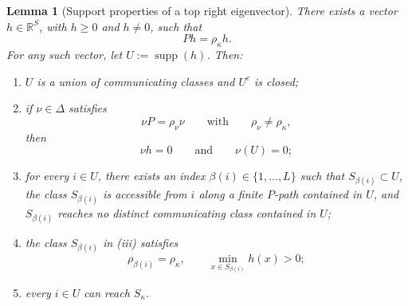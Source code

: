 \documentclass[10pt,letterpaper]{article}
\theoremstyle{compactplain}
\newtheorem{lemma}[theorem]{Lemma}
\theoremstyle{compactdefinition}
\DeclareMathOperator{\supp}{supp}
\newcommand{\1}{\mathds{1}}
\begin{document}
\begin{lemma}[Support properties of a top right eigenvector]
\label{lem:right-perron-support}
There exists a vector \(h\in\mathbb R^S\), with \(h\geq0\) and \(h\neq0\),
such that
\[
Ph=\rho_\kappa h.
\]
For any such vector, let \(U:=\supp(h)\). Then:
\begin{enumerate}[label=\textup{(\roman*)}]
\item \(U\) is a union of communicating classes and \(U^c\) is closed;

\item if \(\nu\in\Delta\) satisfies
\[
\nu P=\rho_\nu\nu
\qquad\text{with}\qquad
\rho_\nu\neq\rho_\kappa,
\]
then
\[
\nu h=0
\qquad\text{and}\qquad
\nu(U)=0;
\]

\item for every \(i\in U\), there exists an index
\(\beta(i)\in\{1,\ldots,L\}\) such that \(S_{\beta(i)}\subset U\),
the class \(S_{\beta(i)}\) is accessible from \(i\) along a finite
\(P\)-path contained in \(U\), and \(S_{\beta(i)}\) reaches no distinct
communicating class contained in \(U\);

\item the class \(S_{\beta(i)}\) in \textup{(iii)} satisfies
\[
\rho_{\beta(i)}=\rho_\kappa,
\qquad
\min_{x\in S_{\beta(i)}}h(x)>0;
\]

\item every \(i\in U\) can reach \(S_\kappa\).
\end{enumerate}
\end{lemma}
\end{document}
